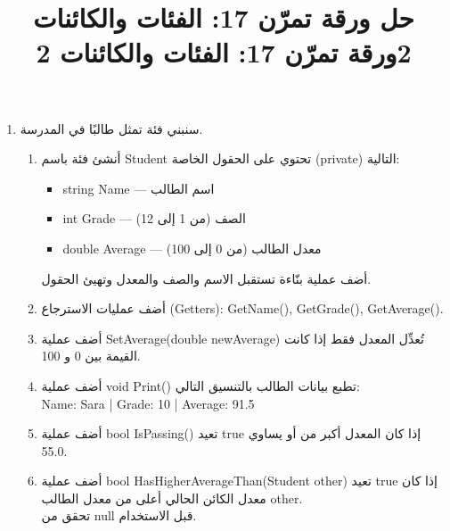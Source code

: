 \documentclass[14pt]{extarticle}
\title{حل ورقة تمرّن 17: الفئات والكائنات 2}
\title{ورقة تمرّن 17: الفئات والكائنات 2}
\begin{document}
\maketitle
\thispagestyle{fancy}

\begin{enumerate}[itemsep=2em]

\item
سنبني فئة تمثل طالبًا في المدرسة.
\begin{enumerate}[itemsep=1em]
    \item أنشئ فئة باسم \textenglish{Student} تحتوي على الحقول الخاصة (\textenglish{private}) التالية:
    \begin{itemize}[itemsep=1pt]
        \item \textenglish{string Name} — اسم الطالب
        \item \textenglish{int Grade} — الصف (من 1 إلى 12)
        \item \textenglish{double Average} — معدل الطالب (من 0 إلى 100)
    \end{itemize}
    أضف عملية بنّاءة تستقبل الاسم والصف والمعدل وتهيئ الحقول.

    \item أضف عمليات الاسترجاع (\textenglish{Getters}):
    \textenglish{GetName()}, \textenglish{GetGrade()}, \textenglish{GetAverage()}.

    \item أضف عملية \textenglish{SetAverage(double newAverage)} تُعدِّل المعدل فقط إذا كانت القيمة بين \textenglish{0} و \textenglish{100}.

    \item أضف عملية \textenglish{void Print()} تطبع بيانات الطالب بالتنسيق التالي: \\
    \textenglish{Name: Sara | Grade: 10 | Average: 91.5}

    \item أضف عملية \textenglish{bool IsPassing()} تعيد \textenglish{true} إذا كان المعدل أكبر من أو يساوي \textenglish{55.0}.

    \item أضف عملية \textenglish{bool HasHigherAverageThan(Student other)} تعيد \textenglish{true} إذا كان معدل الكائن الحالي أعلى من معدل الطالب \textenglish{other}.\\
    تحقق من \textenglish{null} قبل الاستخدام.


\end{enumerate}
\end{enumerate}
\end{document}
